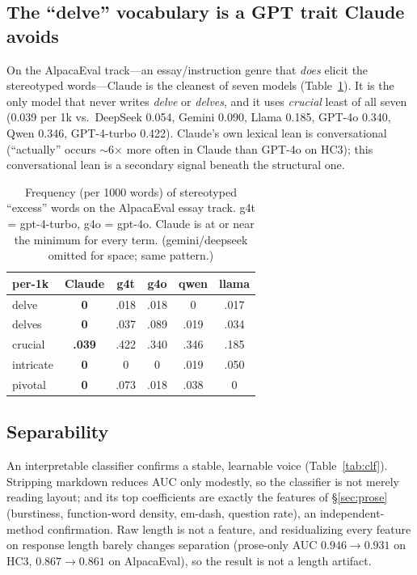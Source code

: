 \documentclass[11pt]{article}
\begin{document}
\subsection{The ``delve'' vocabulary is a GPT trait Claude avoids}
\label{sec:delve}
On the AlpacaEval track---an essay/instruction genre that \emph{does} elicit the
stereotyped words---Claude is the cleanest of seven models
(Table~\ref{tab:delve}). It is the only model that never writes \emph{delve} or
\emph{delves}, and it uses \emph{crucial} least of all seven (0.039 per 1k vs.\
DeepSeek 0.054, Gemini 0.090, Llama 0.185, GPT-4o 0.340, Qwen 0.346, GPT-4-turbo
0.422). Claude's own lexical lean is conversational
(``actually'' occurs $\sim$6$\times$ more often in Claude than GPT-4o on HC3);
this conversational lean is a secondary signal beneath the structural one.

\begin{table}[t]
\centering\small
\begin{tabular}{@{}lccccc@{}}
\toprule
per-1k & Claude & g4t & g4o & qwen & llama \\
\midrule
delve   & \textbf{0} & .018 & .018 & 0 & .017 \\
delves  & \textbf{0} & .037 & .089 & .019 & .034 \\
crucial & \textbf{.039} & .422 & .340 & .346 & .185 \\
intricate & \textbf{0} & 0 & 0 & .019 & .050 \\
pivotal & \textbf{0} & .073 & .018 & .038 & 0 \\
\bottomrule
\end{tabular}
\caption{Frequency (per 1000 words) of stereotyped ``excess'' words on the
AlpacaEval essay track. g4t = gpt-4-turbo, g4o = gpt-4o. Claude is at or near
the minimum for every term. (gemini/deepseek omitted for space; same pattern.)}
\label{tab:delve}
\end{table}

\subsection{Separability}
\label{sec:clf}
An interpretable classifier confirms a stable, learnable voice
(Table~\ref{tab:clf}). Stripping markdown reduces AUC only modestly, so the
classifier is not merely reading layout; and its top coefficients are exactly the
features of \S\ref{sec:prose} (burstiness, function-word density, em-dash,
question rate), an independent-method confirmation. Raw length is not a feature,
and residualizing every feature on response length barely changes separation
(prose-only AUC $0.946{\to}0.931$ on HC3, $0.867{\to}0.861$ on AlpacaEval), so the
result is not a length artifact.
\end{document}
